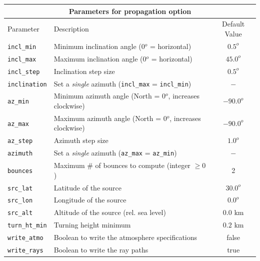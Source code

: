 \documentclass[10pt]{article}
\begin{document}
\begin{tabular}{ | l | l | c | }
  \hline
  \multicolumn{3}{|c|}{\textbf{Parameters for propagation option}} \\
  \hline
  Parameter & Description & Default Value \\
  \hline \hline
 \verb=incl_min= 		& Minimum inclination angle (0\(^o\) = horizontal)					& \(0.5^o\)	\\
 \verb=incl_max= 		& Maximum inclination angle (0\(^o\) = horizontal)					& \(45.0^o\) \\
 \verb=incl_step=  		& Inclination step size										& \(0.5^o\) \\ 
 \verb=inclination=  		& Set a \textit{single} azimuth  (\verb#incl_max# = \verb#incl_min#)		& \(-\) \\ \hline
 \verb=az_min= 		& Minimum azimuth angle (North = 0\(^o\), increases clockwise)		& \(-90.0^o\)	\\
 \verb=az_max= 		& Maximum azimuth angle (North = 0\(^o\), increases clockwise)		& \(-90.0^o\) \\
 \verb=az_step=  		& Azimuth step size											& \(1.0^o\) \\ 
 \verb=azimuth=		& Set a \textit{single} azimuth  (\verb#az_max# = \verb#az_min#)		& \(-\) \\ \hline
 \verb=bounces=		& Maximum \# of bounces to compute (integer \(\geq 0\)) 				& 2 \\ \hline
 \verb=src_lat= 			& Latitude of the source 										& \(30.0^o\) \\
 \verb=src_lon= 		& Longitude of the source										& \(0.0^o\) \\
 \verb=src_alt=  		& Altitude of the source (rel. sea level)							& \(0.0\) km \\ \hline
 \verb=turn_ht_min=		& Turning height minimum									& \(0.2\) km \\
 \verb=write_atmo=		& Boolean to write the atmosphere specifications					& false \\
 \verb=write_rays=		& Boolean to write the ray paths								& true \\  \hline
\end{tabular}

 \vspace{0.01\textheight}
\end{document}
